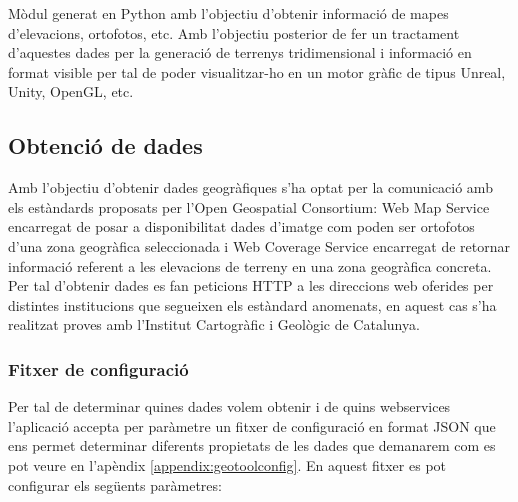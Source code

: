 \documentclass[10pt,a4paper,twocolumn,twoside]{article}
\begin{document}
Mòdul generat en Python amb l'objectiu d'obtenir informació de mapes d'elevacions, ortofotos, etc. Amb l'objectiu posterior de fer un tractament d'aquestes dades per la generació de terrenys tridimensional i informació en format visible per tal de poder visualitzar-ho en un motor gràfic de tipus Unreal, Unity, OpenGL, etc.

\subsection{Obtenció de dades}

Amb l'objectiu d'obtenir dades geogràfiques s'ha optat per la comunicació amb els estàndards proposats per l'Open Geospatial Consortium\cite{ogc}: Web Map Service\cite{wms} encarregat de posar a disponibilitat dades d'imatge com poden ser ortofotos d'una zona geogràfica seleccionada i Web Coverage Service\cite{wcs} encarregat de retornar informació referent a les elevacions de terreny en una zona geogràfica concreta. Per tal d'obtenir dades es fan peticions HTTP a les direccions web oferides per distintes institucions que segueixen els estàndard anomenats, en aquest cas s'ha realitzat proves amb l'Institut Cartogràfic i Geològic de Catalunya\cite{icgc}.

\subsubsection{Fitxer de configuració}

Per tal de determinar quines dades volem obtenir i de quins webservices l'aplicació accepta per paràmetre un fitxer de configuració en format JSON que ens permet determinar diferents propietats de les dades que demanarem com es pot veure en l'apèndix \ref{appendix:geotoolconfig}. En aquest fitxer es pot configurar els següents paràmetres:
\end{document}
